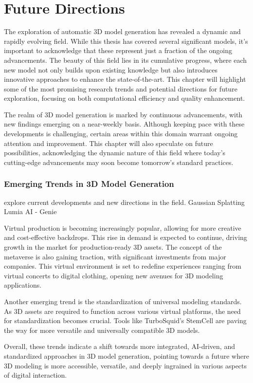 \chapter{Future Directions}
\label{ch:future}
The exploration of automatic 3D model generation has revealed a dynamic and rapidly evolving field. While this thesis has covered several significant models, it's important to acknowledge that these represent just a fraction of the ongoing advancements. The beauty of this field lies in its cumulative progress, where each new model not only builds upon existing knowledge but also introduces innovative approaches to enhance the state-of-the-art. This chapter will highlight some of the most promising research trends and potential directions for future exploration, focusing on both computational efficiency and quality enhancement.

The realm of 3D model generation is marked by continuous advancements, with new findings emerging on a near-weekly basis. Although keeping pace with these developments is challenging, certain areas within this domain warrant ongoing attention and improvement. This chapter will also speculate on future possibilities, acknowledging the dynamic nature of this field where today's cutting-edge advancements may soon become tomorrow's standard practices.


\subsection{Emerging Trends in 3D Model Generation}
explore current developments and new directions in the field.
Gaussian Splatting
Lumia AI - Genie


Virtual production is becoming increasingly popular, allowing for more creative and cost-effective backdrops. This rise in demand is expected to continue, driving growth in the market for production-ready 3D assets. The concept of the metaverse is also gaining traction, with significant investments from major companies. This virtual environment is set to redefine experiences ranging from virtual concerts to digital clothing, opening new avenues for 3D modeling applications.

Another emerging trend is the standardization of universal modeling standards. As 3D assets are required to function across various virtual platforms, the need for standardization becomes crucial. Tools like TurboSquid's StemCell are paving the way for more versatile and universally compatible 3D models.

Overall, these trends indicate a shift towards more integrated, AI-driven, and standardized approaches in 3D model generation, pointing towards a future where 3D modeling is more accessible, versatile, and deeply ingrained in various aspects of digital interaction.



